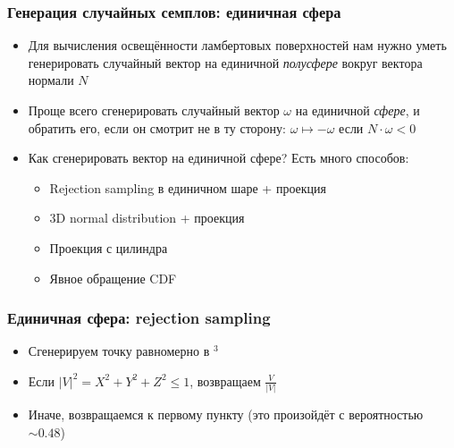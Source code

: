\documentclass[10pt]{beamer}
\begin{document}
\begin{frame}[fragile]
\frametitle{Генерация случайных семплов: единичная сфера}
\begin{itemize}
\item Для вычисления освещённости ламбертовых поверхностей нам нужно уметь генерировать случайный вектор на единичной \textit{полусфере} вокруг вектора нормали \begin{math}N\end{math}
\pause
\item Проще всего сгенерировать случайный вектор \begin{math}\omega\end{math} на единичной \textit{сфере}, и обратить его, если он смотрит не в ту сторону: \begin{math}\omega \mapsto -\omega\end{math} если \begin{math}N\cdot \omega < 0\end{math}
\pause
\item Как сгенерировать вектор на единичной сфере? \pause Есть много способов:
\begin{itemize}
\item Rejection sampling в единичном шаре + проекция
\item 3D normal distribution + проекция
\item Проекция с цилиндра
\item Явное обращение CDF
\end{itemize}
\end{itemize}
\end{frame}

\begin{frame}[fragile]
\frametitle{Единичная сфера: rejection sampling}
\begin{itemize}
\item Сгенерируем точку равномерно в \begin{math}[-1,1]^3\end{math}
\pause
\item Если \begin{math}|V|^2 = X^2+Y^2+Z^2\leq 1\end{math}, возвращаем \begin{math}\frac{V}{|V|}\end{math}
\pause
\item Иначе, возвращаемся к первому пункту (это произойдёт с вероятностью \begin{math}\sim0.48\end{math})
\end{itemize}
\end{frame}
\end{document}
